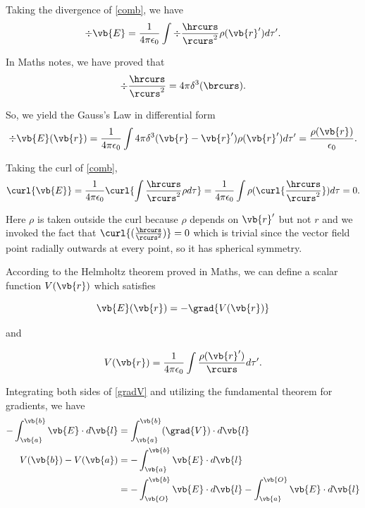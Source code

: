 \documentclass[a4paper,12pt]{report}
\begin{document}
	Taking the divergence of \cref{comb}, we have 
	\begin{equation}
		\div{\vb{E}} = \frac{1}{4\pi\epsilon_0} \int \div{\frac{\hrcurs }{\rcurs ^2} } \rho (\vb{r} ')d\tau '. 	 
	\end{equation}
	
	In Maths notes, we have proved that 
	\begin{equation}
		\div{\frac{\hrcurs }{\rcurs ^2} } = 4\pi \delta ^3 ( \brcurs  ) .
	\end{equation}
	
	So, we yield the Gauss's Law in differential form
	\begin{equation}
		\div{\vb{E} ( \vb{r}  ) }  = \frac{1}{4\pi\epsilon_0} \int 4\pi \delta ^3 ( \vb{r} -\vb{r} ' ) \rho ( \vb{r} ' ) d\tau ' = \frac{\rho ( \vb{r})  }{\epsilon_0}. \label{divE} 
	\end{equation}
	
	Taking the curl of \cref{comb},
	\begin{equation}
		\curl{\vb{E} } = \frac{1}{4\pi\epsilon_0} \curl{\int \frac{\hrcurs }{\rcurs ^2} \rho d\tau } = \frac{1}{4\pi\epsilon_0} \int \rho (\curl{\frac{\hrcurs }{\rcurs ^2}}) d\tau = 0. \label{curlE} 
	\end{equation}
	
	Here \(\rho \) is taken outside the curl because \(\rho \) depends on \(\vb{r} '\) but not \(r\) and we invoked the fact that \(\curl{(\frac{\hrcurs }{\rcurs ^2}) } = 0\) which is trivial since the vector field point radially outwards at every point, so it has spherical symmetry.
	
	According to the Helmholtz theorem proved in Maths, we can define a scalar function \(V(\vb{r} )\) which satisfies
	
	\begin{equation}
		\vb{E} (\vb{r} ) = -\grad{V(\vb{r}) } \label{gradV} 
	\end{equation}
	
	and 
	
	\begin{equation}
		V(\vb{r} ) = \frac{1}{4\pi\epsilon_0} \int \frac{\rho (\vb{r} ')}{\rcurs } d\tau '. \label{potential} 
	\end{equation}
	
	
	Integrating both sides of \cref{gradV} and utilizing the fundamental theorem for gradients, we have 
	\begin{equation} 
		\begin{aligned}
			-\int_{\vb{a} }^{\vb{b} } \vb{E} \cdot d\vb{l} &= \int_{\vb{a} }^{\vb{b} } (\grad{V} ) \cdot d\vb{l} \\
			V(\vb{b} ) - V(\vb{a} ) &= -\int_{\vb{a} }^{\vb{b} } \vb{E} \cdot d\vb{l} \\
			&= -\int_{\vb{O} }^{\vb{b} } \vb{E} \cdot d\vb{l} - \int_{\vb{a} }^{\vb{O}} \vb{E} \cdot d\vb{l} 
		\end{aligned}
	\end{equation}
	
\end{document}
